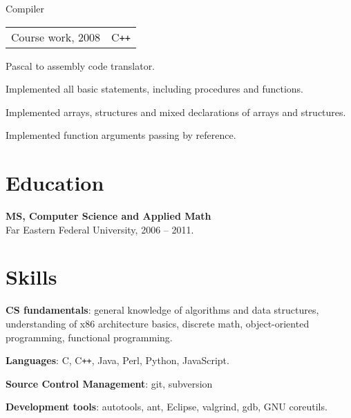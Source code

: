 \documentclass[a4paper]{article}
\begin{document}
\begin{multicols}{2}
		\begin{project2}{Compiler}{\begin{tabular}{@{}l|l}Course work, 2008 & C\texttt{++}\\\end{tabular}}
			Pascal to assembly code translator.
			\begin{items}
				\item Implemented all basic statements, including procedures and functions.
				\item Implemented arrays, structures and mixed declarations of arrays and structures.
				\item Implemented function arguments passing by reference.
			\end{items}
		\end{project2}
	\end{multicols}

	\section{Education}
		\begin{multicols}{2}
			\raggedcolumns
			\begin{items}
				\item \textbf{MS, Computer Science and Applied Math}\\
				Far Eastern Federal University, 2006 -- 2011.
			\end{items}
			\columnbreak
			\hspace{10mm}
		\end{multicols}

	\section{Skills}
	\begin{multicols}{2}
		\raggedcolumns
		\begin{items}
			\item \textbf{CS fundamentals}: general knowledge of algorithms and data structures, understanding of x86 architecture basics, discrete math, object-oriented programming, functional programming.
			\item \textbf{Languages}: C, C\texttt{++}, Java, Perl, Python, JavaScript.
			\columnbreak
			\item \textbf{Source Control Management}: git, subversion
			\item \textbf{Development tools}: autotools, ant, Eclipse, valgrind, gdb, GNU coreutils.
		\end{items}
	\end{multicols}
\end{document}
